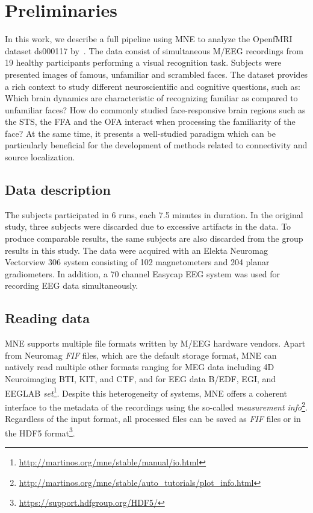 \section{Preliminaries}

In this work, we describe a full pipeline using MNE to analyze the OpenfMRI dataset ds000117 by~\cite{wakeman2015multi}. The data consist of simultaneous M/EEG recordings from 19 healthy participants performing a visual recognition task. Subjects were presented images of famous, unfamiliar and scrambled faces. The dataset provides a rich context to study different neuroscientific and cognitive questions, such as: Which brain dynamics are characteristic of recognizing familiar as compared to unfamiliar faces? How do commonly studied face-responsive brain regions such as the \ac{STS}, the \ac{FFA} and the \ac{OFA} interact when processing the familiarity of the face? At the same time, it presents a well-studied paradigm which can be particularly beneficial for the development of methods related to connectivity and source localization.

\subsection{Data description}

The subjects participated in 6 runs, each 7.5 minutes in duration. In the original study, three subjects were discarded due to excessive artifacts in the data. To produce comparable results, the same subjects are also discarded from the group results in this study. The data were acquired with an Elekta Neuromag Vectorview 306 system consisting of 102 magnetometers and 204 planar gradiometers. In addition, a 70 channel Easycap EEG system was used for recording EEG data simultaneously.

\subsection{Reading data}
MNE supports multiple file formats written by M/EEG hardware vendors.
Apart from Neuromag \textit{FIF} files, which are the default storage format, MNE can natively read multiple other formats ranging for MEG data including 4D Neuroimaging BTI, KIT, and CTF, and for EEG data B/EDF, EGI, and EEGLAB \textit{set}\footnote{\url{http://martinos.org/mne/stable/manual/io.html}}. Despite this heterogeneity of systems, MNE offers a coherent interface to the metadata of the recordings using the so-called \emph{measurement info}\footnote{\url{http://martinos.org/mne/stable/auto_tutorials/plot_info.html}}.
Regardless of the input format, all processed files can be saved as \textit{FIF} files or in the HDF5 format\footnote{\url{https://support.hdfgroup.org/HDF5/}}.

